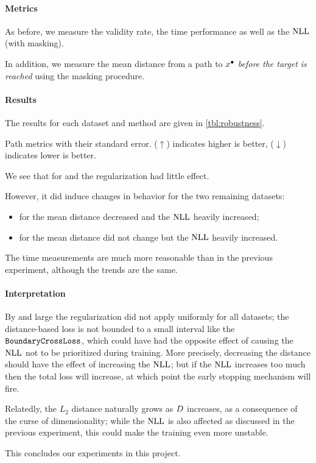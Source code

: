 \documentclass[../main.tex]{subfiles}
\begin{document}
\paragraph{Metrics}

As before, we measure the validity rate, the time performance as well as the $\text{NLL}$ (with masking).

In addition, we measure the mean distance from a path to $x^\bullet$ \emph{before the target is reached}
using the masking procedure.

\paragraph{Results}

The results for each dataset and method are given in \autoref{tbl:robustness}.

\begin{table}[h!]
    \centering
    
    \caption{Path metrics with their standard error. ($\uparrow$) indicates higher is better, ($\downarrow$) indicates lower is better.}
    \label{tbl:robustness}
\end{table}

We see that for \CakeOnSea{} and \WineQuality the regularization had little effect.

However, it did induce changes in behavior for the two remaining datasets:
\begin{itemize}
    \item for \ForestCover{} the mean distance decreased and the $\text{NLL}$ heavily increased;
    \item for \OnlineNewsPopularity{} the mean distance did not change but the $\text{NLL}$ heavily increased.
\end{itemize}

The time measurements are much more reasonable than in the previous experiment, although the trends are the same.

\paragraph{Interpretation}

By and large the regularization did not apply uniformly for all datasets; the distance-based loss
is not bounded to a small interval like the $\mathtt{BoundaryCrossLoss}$, which could have had the opposite
effect of causing the $\text{NLL}$ not to be prioritized during training.
More precisely, decreasing the distance should have the effect of increasing the $\text{NLL}$;
but if the $\text{NLL}$ increases too much then
the total loss will increase, at which point the early stopping mechanism will fire.

Relatedly, the $L_2$ distance naturally grows as $D$ increases, as a consequence of the curse
of dimensionality; while the $\text{NLL}$ is also affected as discussed in the previous experiment, this
could make the training even more unstable.
 
This concludes our experiments in this project.
\end{document}
